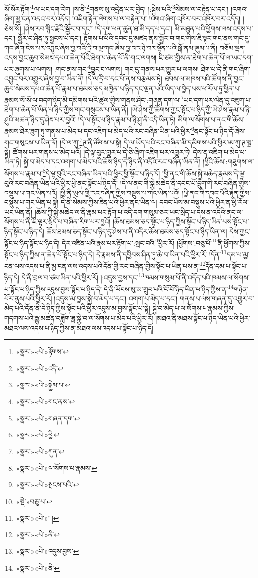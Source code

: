 སོ་སོར་རྟོག་\footnote{«སྣར་»«པེ་»རྟོགས་}ལ་ཡང་དག་རེག །ས་ནི་\footnote{«སྣར་»«པེ་»འདི་}གནས་སུ་འདྲེན་པར་བྱེད། །:སྐྱེས་པའི་\footnote{«སྣར་»«པེ་»སྐྱེས་པ་}སེམས་ལ་བརྟེན་པ་དང་། །འགའ་ཞིག་མྱ་ངན་འདའ་བར་འདོད། །འཇིག་རྟེན་ལེགས་པ་ལ་བརྟེན་པ། །འགའ་ཞིག་འཁོར་བར་འཁོར་བར་འདོད། །ཅེས་སོ། །ཤེས་རབ་སྙིང་རྗེའི་སྦྱོར་བ་དང་། །དེ་དག་ཕན་ཚུན་ཐ་མི་དད་པ་དང་། མི་མཐུན་པའི་ཕྱོགས་ལས་འདས་པ་དང་། སྦྱོར་བ་ཤིན་ཏུ་སྦྱངས་པ་དང་། རྟོགས་པ་པོའི་དབང་དུ་མཛད་ནས་སྦྱོར་བ་གང་གིས་ཇི་ལྟར་གང་ནས་གང་དུ་གང་ཞིག་ངེས་པར་འབྱུང་ཞེས་བྱ་བའི་དྲི་བ་ལྔ་གང་ཞེས་བྱ་བར་ཉེ་བར་སྟོན་པའི་སྒོ་ནས་ཞུས་པ་ནི། བཅོམ་ལྡན་འདས་བྱང་ཆུབ་སེམས་དཔའ་ཆེན་པོའི་ཐེག་པ་ཆེན་པོ་ནི་གང་ལགས། ཇི་ཙམ་གྱིས་ན་ཐེག་པ་ཆེན་པོ་ལ་ཡང་དག་པར་ཞུགས་པ་ལགས། :གང་ནས་གང་\footnote{«སྣར་»«པེ་»གང་ནས་}བྱུང་བ་ལགས། གང་དུ་གནས་པར་གྱུར་པ་ལགས། ཐེག་པ་དེ་ནི་གང་ཞིག་འབྱུང་བར་འགྱུར་ཞེས་བྱ་བ་ཡིན་ནོ། །དེ་ལ་དྲི་བ་དང་པོ་ནས་བརྩམས་ཏེ། ཐབས་ལ་མཁས་པའི་ཚོགས་ནི་བྱང་ཆུབ་སེམས་དཔའ་ཆེན་པོ་རྣམ་པ་ཐམས་ཅད་མཁྱེན་པ་ཉིད་དང་ལྡན་པའི་ཡིད་ལ་བྱེད་པས་ཕ་རོལ་ཏུ་ཕྱིན་པ་རྣམས་སོ་སོ་ལ་བདག་ཉིད་མི་དམིགས་པའི་ཚུལ་གྱིས་གནས་ཤིང་:གཞན་དག་ལ་\footnote{«སྣར་»«པེ་»གཞན་དག་}ཡང་དག་པར་ལེན་དུ་འཇུག་པ་ཐེག་པ་ཆེན་པོ་ཡིན་པ་ཉིད་ཀྱིས་གང་གསུངས་པ་ཡིན་ནོ། །ཡེ་ཤེས་ཀྱི་ཚོགས་ཀྱང་སྟོང་པ་ཉིད་ཀྱི་ཡེ་ཤེས་རྣམ་པ་ཉི་ཤུའི་མཚན་ཉིད་དུ་ཤེས་པར་བྱའོ། །དེ་ལ་སྟོང་པ་ཉིད་རྣམ་པ་ཉི་ཤུ་ནི་འདི་ཡིན་ཏེ། མིག་ལ་སོགས་པ་ནང་གི་ཆོས་རྣམས་ཐེར་ཟུག་ཏུ་གནས་པ་མེད་པ་དང་འཇིག་པ་མེད་པའི་རང་བཞིན་ཡིན་པའི་ཕྱིར་\footnote{«སྣར་»«པེ་»ཕྱི་}ནང་སྟོང་པ་ཉིད་དོ་ཞེས་གང་གསུངས་པ་ཡིན་ནོ། །དེ་ལ་ཀུ་\footnote{«སྣར་»«པེ་»ཀུན་}ཊ་ནི་ཚོགས་པ་སྟེ། དེ་ལ་ཡོད་པའི་རང་བཞིན་མི་དམིགས་པའི་ཕྱིར་ཨ་ཀུ་ཊ་སྠ་སྟེ། ཚོགས་པར་གནས་པ་མེད་པའོ། །དེ་ལྟ་བུར་གྱུར་པ་དེ་ཅི་ཞིག་འཇིག་པར་འགྱུར་ཏེ། དེས་ན་འཇིག་པ་མེད་པ་ཡིན་ཏེ། སྐྱེ་བ་མེད་པ་དང་འགག་པ་མེད་པའི་ཆོས་ཉིད་དེ་ཉིད་ནི་འདིའི་རང་བཞིན་ཡིན་ནོ། །ཕྱིའི་ཆོས་:གཟུགས་ལ་སོགས་པ་རྣམ་པ་\footnote{«སྣར་»«པེ་»ལ་སོགས་པ་རྣམས་}དེ་ལྟ་བུའི་རང་བཞིན་ཡིན་པའི་ཕྱིར་ཕྱི་སྟོང་པ་ཉིད་དོ། །ཕྱི་ནང་གི་ཆོས་སྐྱེ་མཆེད་རྣམས་དེ་ལྟ་བུའི་རང་བཞིན་ཡིན་པའི་ཕྱིར་ཕྱི་ནང་སྟོང་པ་ཉིད་དོ། །དེ་ལ་ནང་གི་སྐྱེ་མཆེད་ནི་དབང་པོ་དྲུག་གི་རང་བཞིན་གྱིས་བསྡུས་པ་གང་ཡིན་པའོ། །ཕྱི་ནི་ཡུལ་གྱི་རང་བཞིན་གྱིས་བསྡུས་པ་གང་ཡིན་པའོ། །ཕྱི་ནང་གི་དབང་པོའི་རྟེན་གྱིས་བསྡུས་པ་གང་ཡིན་པ་སྟེ། དེ་ནི་སེམས་ཀྱིས་ཟིན་པའི་ཕྱིར་ནང་ཡིན་ལ། དབང་པོས་མ་བསྡུས་པའི་ཕྱིར་ན་ཕྱི་རོལ་ཡང་ཡིན་ནོ། །ཆོས་ཀྱི་སྐྱེ་མཆེད་ལ་ནི་རྣམ་པར་རྟོག་པ་འདི་དག་གསུམ་ཅར་ཡང་སྲིད་པ་དེས་ན་འདིའི་ནང་ལ་སོགས་པ་ནི་ཇི་ལྟར་སྲིད་པ་བཞིན་རིག་པར་བྱའོ། །ཆོས་ཐམས་ཅད་སྟོང་པ་ཉིད་ཀྱིས་སྟོང་པ་ཉིད་ཡིན་པས་སྟོང་པ་ཉིད་སྟོང་པ་ཉིད་དེ། ཆོས་ཐམས་ཅད་སྟོང་པ་ཉིད་དུ་ཤེས་པ་ནི་འདིར་ཆོས་ཐམས་ཅད་སྟོང་པ་ཉིད་ཡིན་ལ། དེས་ཀྱང་སྟོང་པ་ཉིད་སྟོང་པ་ཉིད་དེ། དེར་འཛིན་པའི་རྣམ་པར་རྟོག་པ་:སྤང་བའི་\footnote{«སྣར་»«པེ་»སྤངས་པའི་}ཕྱིར་རོ། །ཕྱོགས་:བཅུ་པོ་\footnote{«སྡེ་»བཅུ་པ་}ནི་ཕྱོགས་ཀྱིས་སྟོང་པ་ཉིད་ཀྱིས་ན་ཆེན་པོ་སྟོང་པ་ཉིད་དེ། དེ་རྣམས་ནི་དབྱིབས་ཤིན་ཏུ་ཆེ་བ་ཡིན་པའི་ཕྱིར་རོ། །དོན་\footnote{«སྣར་»«པེ་»། །}དམ་པ་མྱ་ངན་ལས་འདས་པ་ནི་མྱ་ངན་ལས་འདས་པའི་དོན་གྱི་རང་བཞིན་གྱིས་སྟོང་པ་ཡིན་པས་ན་\footnote{«སྣར་»«པེ་»ནི་}དོན་དམ་པ་སྟོང་པ་ཉིད་དེ། དེ་ནི་བྲལ་བ་ཙམ་ཡིན་པའི་ཕྱིར་རོ། །:འདུས་བྱས་དང་\footnote{«སྣར་»«པེ་»འདུས་བྱས་}ཁམས་གསུམ་པོ་ནི་འདོད་པའི་ཁམས་ལ་སོགས་པ་སྟོང་པ་ཉིད་ཀྱིས་འདུས་བྱས་སྟོང་པ་ཉིད་དེ། དེ་ནི་ཡོངས་སུ་མ་གྲུབ་པའི་ངོ་བོ་ཉིད་ཡིན་པ་ཉིད་ཀྱིས་ན་\footnote{«སྣར་»«པེ་»ནི་}གཉེན་པོར་ནུས་པའི་ཕྱིར་རོ། །འདུས་མ་བྱས་སྐྱེ་བ་མེད་པ་དང་། འགག་པ་མེད་པ་དང་། གནས་པ་ལས་གཞན་དུ་འགྱུར་བ་མེད་པའི་དོན་ནི་དེ་ཉིད་ཀྱིས་སྟོང་པའི་ཕྱིར་འདུས་མ་བྱས་སྟོང་པ་སྟེ། སྐྱེ་བ་མེད་པ་ལ་སོགས་པ་རྣམས་ཀྱིས་གདགས་པའི་རྒྱུ་མཚན་བཟློག་ཟླ་སྐྱེ་བ་ལ་སོགས་པ་མེད་པའི་ཕྱིར་རོ། །མཐའ་ནི་མཐས་སྟོང་པ་ཉིད་ཡིན་པའི་ཕྱིར་མཐའ་ལས་འདས་པ་ཉིད་ཀྱིས་ན་མཐའ་ལས་འདས་པ་སྟོང་པ་ཉིད་དོ། 